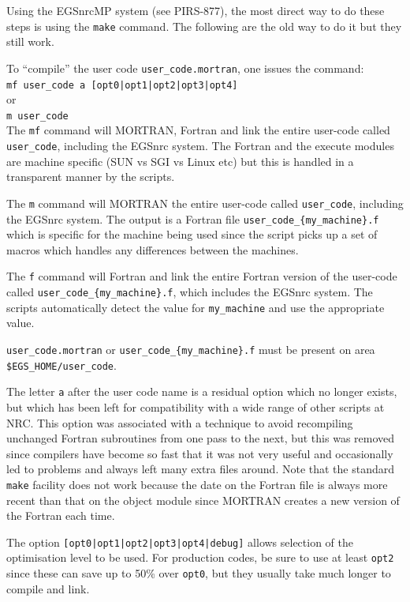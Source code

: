 Using the EGSnrcMP system (see PIRS-877\cite{Ka03}), the most direct way to
do these steps is using the {\tt make} command.  The following are the old
way to do it but they still work.

To ``compile'' the user code {\tt user\_code.mortran}, one issues the command:\\
\verb+mf user_code a [opt0|opt1|opt2|opt3|opt4]+\\
or\\
\verb+m user_code+\\

The \verb+mf+ command will MORTRAN, Fortran and link the
entire user-code called \verb+user_code+, including the EGSnrc
system.  The Fortran and the execute modules are machine specific (SUN vs
SGI vs Linux etc) but this is handled in a transparent manner by the scripts.

The \verb+m+ command will MORTRAN the entire user-code
called \verb+user_code+, including the EGSnrc system. The output is
a Fortran file \verb+user_code_{my_machine}.f+ which is specific for the
machine being used since the script picks up a set of macros which
handles any differences between the machines.

The \verb+f+ command will Fortran and link the entire
Fortran version of the user-code called
\verb+user_code_{my_machine}.f+, which includes the EGSnrc system.
The scripts automatically detect the value for \verb+my_machine+ and use
the appropriate value.

\verb+user_code.mortran+ or \verb+user_code_{my_machine}.f+
must be present on area \\
\verb+$EGS_HOME/user_code+.

The letter {\tt a} after the user code name is a residual option which no
longer exists, but which has been left for compatibility with
a wide range of other scripts at NRC.  This option was associated with a
technique to avoid recompiling unchanged Fortran subroutines from one pass
to the next, but this was removed since compilers have become so fast that
it was not very useful and occasionally led to problems and always left
many extra files around. Note that  the
standard \verb+make+ facility does not work because the date on the Fortran
file is
always more recent than that on the object module since MORTRAN creates
a new version of the Fortran each time.


The option \verb+[opt0|opt1|opt2|opt3|opt4|debug]+ allows selection of
the optimisation level to be used.  For production codes, be sure to use
at least \verb+opt2+ since these can save up to 50\% over
\verb+opt0+, but they usually take much longer to compile and link.


